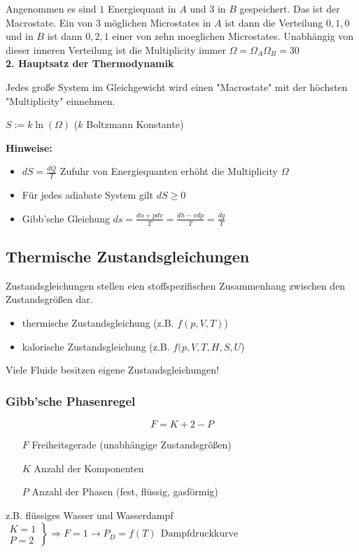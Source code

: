 \documentclass[10pt,a4paper]{article}
\begin{document}
Angenommen es sind $1$ Energiequant in $A$ und $3$ in $B$ gespeichert. Das ist der Macrostate. Ein von 3 möglichen Microstates in $A$ ist dann die Verteilung $0,1,0$ und in $B$ ist dann $0,2,1$ einer von zehn moeglichen Microstates. Unabhängig von dieser inneren Verteilung ist die Multiplicity immer $\Omega = \Omega_A \Omega_B = 30$ \\

\textbf{2. Hauptsatz der Thermodynamik}

Jedes große System im Gleichgewicht wird einen "Macrostate" mit der höchsten "Multiplicity" einnehmen.

$S := k \ln(\Omega)$ ($k$ Boltzmann Konstante)

\textbf{Hinweise:}
\begin{itemize}
\item $dS = \frac{dQ}{T}$ Zufuhr von Energiequanten erhöht die Multiplicity $\Omega$
\item Für jedes adiabate System gilt $dS \geq 0$
\item Gibb'sche Gleichung $ds = \frac{du + pdv}{T} = \frac{dh - vdp}{T} = \frac{dq}{T}$
\end{itemize}

\subsection{Thermische Zustandsgleichungen}

Zustandsgleichungen stellen eien stoffspezifischen Zusammenhang zwischen den Zustandsgrößen dar.
\begin{itemize}
\item thermische Zustandsgleichung (z.B. $f(p, V, T)$)
\item kalorische Zustandsgleichung (z.B. $f(p, V, T, H, S, U$)
\end{itemize}
Viele Fluide besitzen eigene Zustandsgleichungen!

\subsubsection{Gibb'sche Phasenregel}

\[F = K + 2 - P\]
\begin{itemize}
\item[$F$] Freiheitsgerade (unabhängige Zustandsgrößen)
\item[$K$] Anzahl der Komponenten
\item[$P$] Anzahl der Phasen (fest, flüssig, gasförmig)
\end{itemize}
z.B. flüssiges Wasser und Wasserdampf \\
$\left.
\begin{array}{ll}
K = 1 \\ 
P = 2
\end{array}
\right\}
\Rightarrow F = 1 \rightarrow P_D = f(T) ~~ \text{Dampfdruckkurve}
$
\end{document}
